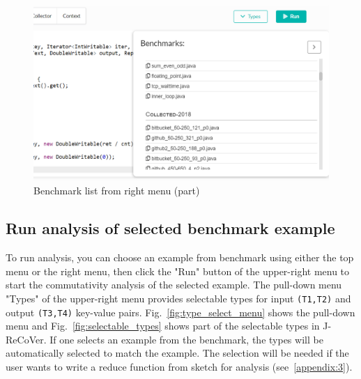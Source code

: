 \begin{figure}
\begin{center}
\includegraphics[width=.8\linewidth]{screenshots/benchmark_list_right}
\caption{Benchmark list from right menu (part)}
\label{fig:benchmark_list_right}
\end{center}
\end{figure}

\subsection{Run analysis of selected benchmark example}
\label{appendix:2}

To run analysis, you can choose an example from benchmark using either the top menu or the right menu, then click the "Run" button of the upper-right menu to start the commutativity analysis of the selected example. The pull-down menu "Types" of the upper-right menu provides selectable types for input \texttt{(T1,T2)} and output \texttt{(T3,T4)} key-value pairs. Fig.~\ref{fig:type_select_menu} shows the pull-down menu and Fig.~\ref{fig:selectable_types} shows part of the selectable types in J-ReCoVer. If one selects an example from the benchmark, the types will be automatically selected to match the example. The selection will be needed if the user wants to write a reduce function from sketch for analysis (see~\ref{appendix:3}).

